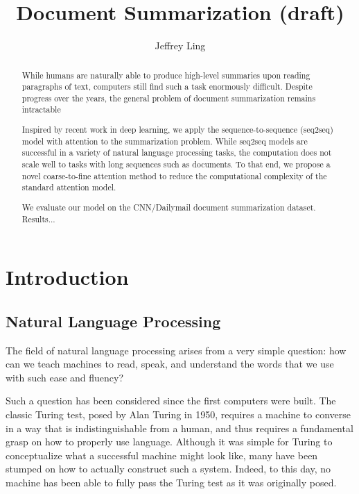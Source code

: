 \documentclass[12pt]{report}
\title{Document Summarization (draft)}
\author{Jeffrey Ling}
\begin{document}
\maketitle{}
\onehalfspacing

\begin{abstract} %
While humans are naturally able to produce high-level summaries upon reading paragraphs of text, computers still find such a task enormously difficult. Despite progress over the years, the general problem of document summarization remains intractable

Inspired by recent work in deep learning, we apply the sequence-to-sequence (seq2seq) model with attention to the summarization problem. While seq2seq models are successful in a variety of natural language processing tasks, the computation does not scale well to tasks with long sequences such as documents. To that end, we propose a novel coarse-to-fine attention method to reduce the computational complexity of the standard attention model.

We evaluate our model on the CNN/Dailymail document summarization dataset. Results...
\end{abstract}

\tableofcontents{}



\chapter{Introduction}

\section{Natural Language Processing}

The field of natural language processing arises from a very simple question: how can we teach machines to read, speak, and understand the words that we use with such ease and fluency?

Such a question has been considered since the first computers were built. The classic Turing test, posed by Alan Turing in 1950, requires a machine to converse in a way that is indistinguishable from a human, and thus requires a fundamental grasp on how to properly use language.
Although it was simple for Turing to conceptualize what a successful machine might look like, many have been stumped on how to actually construct such a system.
Indeed, to this day, no machine has been able to fully pass the Turing test as it was originally posed.
\end{document}
